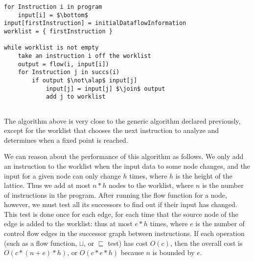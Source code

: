 \documentclass[11pt]{article}
\newcommand{\join}{\sqcup}
\newcommand{\alap}{\sqsubseteq}
\begin{document}

\begin{lstlisting}[mathescape]
for Instruction i in program
    input[i] = $\bottom$
input[firstInstruction] = initialDataflowInformation
worklist = { firstInstruction }

while worklist is not empty
    take an instruction i off the worklist
    output = flow(i, input[i])
	for Instruction j in succs(i)
		if output $\not\alap$ input[j]
			input[j] = input[j] $\join$ output
			add j to worklist
	
\end{lstlisting}

\noindent The algorithm above is very close to the generic algorithm declared
previously, except for the worklist that chooses the next instruction to analyze
and determines when a fixed point is reached.



We can reason about the performance of this algorithm as follows.  We only add
an instruction to the worklist when the input data to some node changes, and the
input for a given node can only change $h$ times, where $h$ is the height of the
lattice.  Thus we add at most $n*h$ nodes to the worklist, where $n$ is the
number of instructions in the program.  After running the flow function for a
node, however, we must test all its successors to find out if their input has
changed.  This test is done once for each edge, for each time that the source
node of the edge is added to the worklist: thus at most $e*h$ times, where $e$
is the number of control flow edges in the successor graph between instructions.
If each operation (such as a flow function, $\join$, or $\alap$ test) has cost
$O(c)$, then the overall cost is $O(c * (n+e) * h)$, or $O(c*e*h)$ because $n$
is bounded by $e$.
\end{document}
